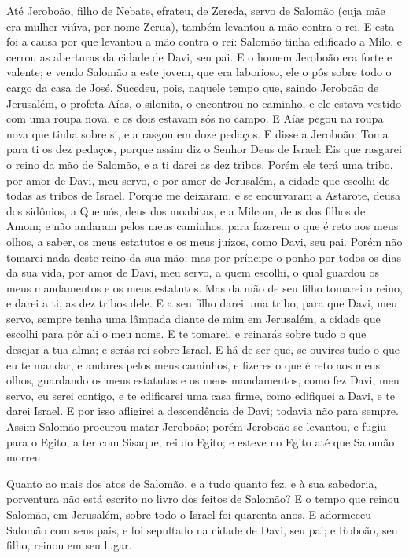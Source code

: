Até Jeroboão, filho de Nebate, efrateu, de Zereda, servo de
Salomão (cuja mãe era mulher viúva, por nome Zerua), também levantou
a mão contra o rei. E esta foi a causa por que levantou a mão
contra o rei: Salomão tinha edificado a Milo, e cerrou as aberturas
da cidade de Davi, seu pai. E o homem Jeroboão era forte e
valente; e vendo Salomão a este jovem, que era laborioso, ele o pôs
sobre todo o cargo da casa de José. Sucedeu, pois, naquele
tempo que, saindo Jeroboão de Jerusalém, o profeta Aías, o silonita,
o encontrou no caminho, e ele estava vestido com uma roupa nova, e
os dois estavam sós no campo. E Aías pegou na roupa nova que
tinha sobre si, e a rasgou em doze pedaços. E disse a
Jeroboão: Toma para ti os dez pedaços, porque assim diz o Senhor
Deus de Israel: Eis que rasgarei o reino da mão de Salomão, e a ti
darei as dez tribos. Porém ele terá uma tribo, por amor de
Davi, meu servo, e por amor de Jerusalém, a cidade que escolhi de
todas as tribos de Israel. Porque me deixaram, e se
encurvaram a Astarote, deusa dos sidônios, a Quemós, deus dos
moabitas, e a Milcom, deus dos filhos de Amom; e não andaram pelos
meus caminhos, para fazerem o que é reto aos meus olhos, a saber, os
meus estatutos e os meus juízos, como Davi, seu pai. Porém
não tomarei nada deste reino da sua mão; mas por príncipe o ponho
por todos os dias da sua vida, por amor de Davi, meu servo, a quem
escolhi, o qual guardou os meus mandamentos e os meus estatutos.
Mas da mão de seu filho tomarei o reino, e darei a ti, as dez
tribos dele. E a seu filho darei uma tribo; para que Davi,
meu servo, sempre tenha uma lâmpada diante de mim em Jerusalém, a
cidade que escolhi para pôr ali o meu nome. E te tomarei, e
reinarás sobre tudo o que desejar a tua alma; e serás rei sobre
Israel. E há de ser que, se ouvires tudo o que eu te mandar,
e andares pelos meus caminhos, e fizeres o que é reto aos meus
olhos, guardando os meus estatutos e os meus mandamentos, como fez
Davi, meu servo, eu serei contigo, e te edificarei uma casa firme,
como edifiquei a Davi, e te darei Israel. E por isso
afligirei a descendência de Davi; todavia não para sempre.
Assim Salomão procurou matar Jeroboão; porém Jeroboão se
levantou, e fugiu para o Egito, a ter com Sisaque, rei do Egito; e
esteve no Egito até que Salomão morreu.

Quanto ao mais dos atos de Salomão, e a tudo quanto fez, e à sua
sabedoria, porventura não está escrito no livro dos feitos de
Salomão? E o tempo que reinou Salomão, em Jerusalém, sobre
todo o Israel foi quarenta anos. E adormeceu Salomão com seus
pais, e foi sepultado na cidade de Davi, seu pai; e Roboão, seu
filho, reinou em seu lugar.

